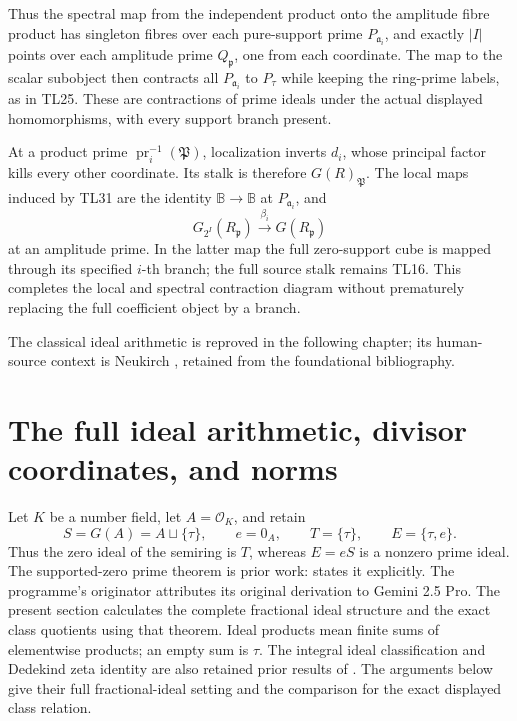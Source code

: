 \documentclass[11pt,a4paper]{article}
\theoremstyle{definition}\newtheorem{definition}[theorem]{Definition}
\begin{document}
Thus the spectral map from the independent product onto the amplitude
fibre product has singleton fibres over each pure-support prime
\(P_{\mathfrak a_i}\), and exactly \(|I|\) points over each amplitude
prime \(Q_{\mathfrak p}\), one from each coordinate. The map to the
scalar subobject then contracts all \(P_{\mathfrak a_i}\) to \(P_\tau\)
while keeping the ring-prime labels, as in TL25. These are contractions
of prime ideals under the actual displayed homomorphisms, with every
support branch present.

At a product prime \(\operatorname{pr}_i^{-1}(\mathfrak P)\),
localization inverts \(d_i\), whose principal factor kills every other
coordinate. Its stalk is therefore \(G(R)_{\mathfrak P}\). The local
maps induced by TL31 are the identity \(\mathbb B\to\mathbb B\) at
\(P_{\mathfrak a_i}\), and \[
 G_{2^I}(R_{\mathfrak p})\xrightarrow{\beta_i}G(R_{\mathfrak p})
 \tag{TL32}
\] at an amplitude prime. In the latter map the full zero-support cube
is mapped through its specified \(i\)-th branch; the full source stalk
remains TL16. This completes the local and spectral contraction diagram
without prematurely replacing the full coefficient object by a branch.


The classical ideal arithmetic is reproved in the following chapter; its human-source context is Neukirch \cite{neukirch}, retained from the foundational bibliography.

\section{The full ideal arithmetic, divisor coordinates, and norms}
\label{sec:sz-divisors}

Let \(K\) be a number field, let \(A=\mathcal O_K\), and retain
\[
 S=G(A)=A\sqcup\{\tau\},\qquad e=0_A,\qquad
 T=\{\tau\},\qquad E=\{\tau,e\}.
\]
Thus the zero ideal of the semiring is \(T\), whereas \(E=eS\) is a
nonzero prime ideal. The supported-zero prime theorem is prior work:
\cite[\texttt{thm:zero-prime-not-irr}]{globalization} states it explicitly.
The programme's originator attributes its original derivation to
Gemini 2.5 Pro. The present section calculates the complete fractional
ideal structure and the exact class quotients using that theorem.
Ideal products mean finite sums of elementwise products; an empty
sum is \(\tau\).
The integral ideal classification and Dedekind zeta identity are also
retained prior results of
\cite[\texttt{thm:OK-ideals-spectrum}, \texttt{thm:Dedekind-zeta}]{globalization}.
The arguments below give their full fractional-ideal setting and
the comparison for the exact displayed class relation.
\end{document}

